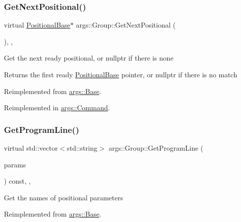 \subsubsection{\texorpdfstring{Get\+Next\+Positional()}{GetNextPositional()}}
{\footnotesize\ttfamily virtual \hyperlink{classargs_1_1_positional_base}{Positional\+Base}$\ast$ args\+::\+Group\+::\+Get\+Next\+Positional (\begin{DoxyParamCaption}{ }\end{DoxyParamCaption})\hspace{0.3cm}{\ttfamily [inline]}, {\ttfamily [override]}, {\ttfamily [virtual]}}

Get the next ready positional, or nullptr if there is none

\begin{DoxyReturn}{Returns}
the first ready \hyperlink{classargs_1_1_positional_base}{Positional\+Base} pointer, or nullptr if there is no match 
\end{DoxyReturn}


Reimplemented from \hyperlink{classargs_1_1_base_a3e5ad8516fd2037496cd39bcb3b10f9d}{args\+::\+Base}.



Reimplemented in \hyperlink{classargs_1_1_command_a073266d188b3592f745c64567e566f8a}{args\+::\+Command}.

\mbox{\label{classargs_1_1_group_abe9ab07499ec19e941df8f38e18089df}} 
\subsubsection{\texorpdfstring{Get\+Program\+Line()}{GetProgramLine()}}
{\footnotesize\ttfamily virtual std\+::vector$<$std\+::string$>$ args\+::\+Group\+::\+Get\+Program\+Line (\begin{DoxyParamCaption}\item[{const \hyperlink{structargs_1_1_help_params}{Help\+Params} \&}]{params }\end{DoxyParamCaption}) const\hspace{0.3cm}{\ttfamily [inline]}, {\ttfamily [override]}, {\ttfamily [virtual]}}

Get the names of positional parameters 

Reimplemented from \hyperlink{classargs_1_1_base_a88fcbbc4bfe3b7af9fafe6e96a19f337}{args\+::\+Base}.




